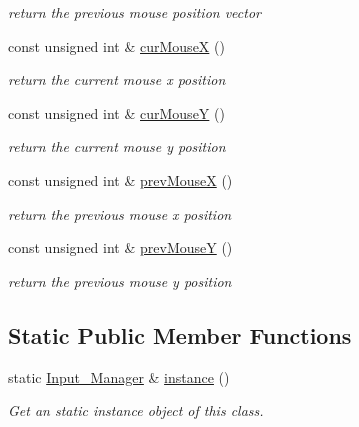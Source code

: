 \begin{DoxyCompactItemize}
\begin{DoxyCompactList}\small\item\em return the previous mouse position vector \end{DoxyCompactList}\item 
const unsigned int \& \mbox{\hyperlink{classprz_1_1_input___manager_a401badf5d71a45de8ac2c66d1968afe2}{cur\+MouseX}} ()
\begin{DoxyCompactList}\small\item\em return the current mouse x position \end{DoxyCompactList}\item 
const unsigned int \& \mbox{\hyperlink{classprz_1_1_input___manager_a243d25eb8d2b06964571fcffc44aa480}{cur\+MouseY}} ()
\begin{DoxyCompactList}\small\item\em return the current mouse y position \end{DoxyCompactList}\item 
const unsigned int \& \mbox{\hyperlink{classprz_1_1_input___manager_ab71276ab97b9270a69b7ea21856cb92a}{prev\+MouseX}} ()
\begin{DoxyCompactList}\small\item\em return the previous mouse x position \end{DoxyCompactList}\item 
const unsigned int \& \mbox{\hyperlink{classprz_1_1_input___manager_a29a282fe4727180e4ea68a67417efea0}{prev\+MouseY}} ()
\begin{DoxyCompactList}\small\item\em return the previous mouse y position \end{DoxyCompactList}\end{DoxyCompactItemize}
\subsection*{Static Public Member Functions}
\begin{DoxyCompactItemize}
\item 
static \mbox{\hyperlink{classprz_1_1_input___manager}{Input\+\_\+\+Manager}} \& \mbox{\hyperlink{classprz_1_1_input___manager_a6bc910b69659d7ea1288ed5758bfe9e5}{instance}} ()
\begin{DoxyCompactList}\small\item\em Get an static instance object of this class. \end{DoxyCompactList}\end{DoxyCompactItemize}


